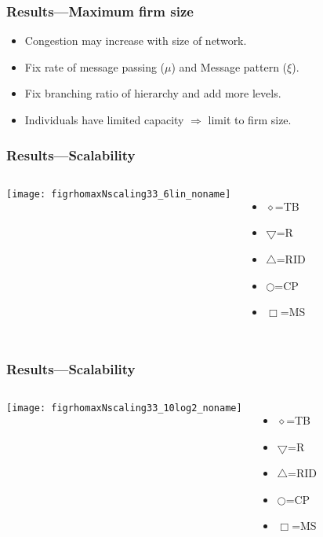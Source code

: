 \begin{frame}
  \frametitle{Results---Maximum firm size}

  \begin{itemize}
  \item<1->
    Congestion may increase with size
    of network.
  \item<2-> 
    Fix rate of message passing ($\mu$)
    and
    Message pattern ($\xi$).
  \item<3->
    Fix branching ratio of hierarchy  and add more levels.
  \item<4-> 
    Individuals have limited capacity 
    $\Rightarrow$ limit to firm size.
  \end{itemize}

\end{frame}


\begin{frame}
  \frametitle{Results---Scalability}

  \begin{columns}
    \texttt{[image: figrhomaxNscaling33\_6lin\_noname]}
    \begin{itemize}
    \item[] 
        {\Large$\diamond$}=TB
    \item[]
        $\bigtriangledown$=R
    \item[]
        $\bigtriangleup$=RID 
    \item[]
        {\small$\bigcirc$}=CP
    \item[]
        $\Box$=MS 
    \end{itemize}
  \end{columns}

\end{frame}

\begin{frame}
  \frametitle{Results---Scalability}

  \begin{columns}
    \texttt{[image: figrhomaxNscaling33\_10log2\_noname]}
    \begin{itemize}
    \item[] 
        {\Large$\diamond$}=TB
    \item[]
        $\bigtriangledown$=R
    \item[]
        $\bigtriangleup$=RID 
    \item[]
        {\small$\bigcirc$}=CP
    \item[]
        $\Box$=MS 
    \end{itemize}
  \end{columns}

\end{frame}



